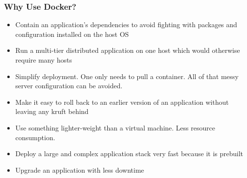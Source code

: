 \documentclass[helvetica,english,utf8,notitle,nologo]{beamer}
\begin{document}
\begin{frame}
  \frametitle{Why Use Docker?}

  \begin{itemize}
  \item Contain an application's dependencies to avoid fighting with
    packages and configuration installed on the host OS
  \item Run a multi-tier distributed application on one host which
    would otherwise require many hosts
  \item Simplify deployment. One only needs to pull a container. All
    of that messy server configuration can be avoided.
  \item Make it easy to roll back to an earlier version of an
    application without leaving any kruft behind
  \item Use something lighter-weight than a virtual machine. Less
    resource consumption.
  \item Deploy a large and complex application stack very fast because
    it is prebuilt
  \item Upgrade an application with less downtime
  \end{itemize}

\end{frame}
\end{document}
